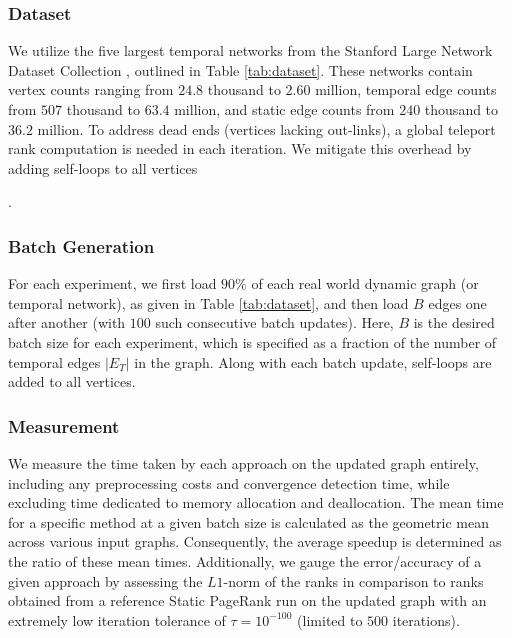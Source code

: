 \subsubsection{Dataset}

We utilize the five largest temporal networks from the Stanford Large Network Dataset Collection \cite{snapnets}, outlined in Table \ref{tab:dataset}. These networks contain vertex counts ranging from $24.8$ thousand to $2.60$ million, temporal edge counts from $507$ thousand to $63.4$ million, and static edge counts from $240$ thousand to $36.2$ million. To address dead ends (vertices lacking out-links), a global teleport rank computation is needed in each iteration. We mitigate this overhead by adding self-loops to all vertices \cite{kolda2009generalized, rank-andersen07, rank-langville06}.




\subsubsection{Batch Generation}
\label{sec:batch-generation}

For each experiment, we first load $90\%$ of each real world dynamic graph (or temporal network), as given in Table \ref{tab:dataset}, and then load $B$ edges one after another (with $100$ such consecutive batch updates). Here, $B$ is the desired batch size for each experiment, which is specified as a fraction of the number of temporal edges $|E_T|$ in the graph. Along with each batch update, self-loops are added to all vertices.


\subsubsection{Measurement}
\label{sec:measurement}

We measure the time taken by each approach on the updated graph entirely, including any preprocessing costs and convergence detection time, while excluding time dedicated to memory allocation and deallocation. The mean time for a specific method at a given batch size is calculated as the geometric mean across various input graphs. Consequently, the average speedup is determined as the ratio of these mean times. Additionally, we gauge the error/accuracy of a given approach by assessing the $L1$-norm \cite{ohsaka2015efficient} of the ranks in comparison to ranks obtained from a reference Static PageRank run on the updated graph with an extremely low iteration tolerance of $\tau = 10^{-100}$ (limited to $500$ iterations).

